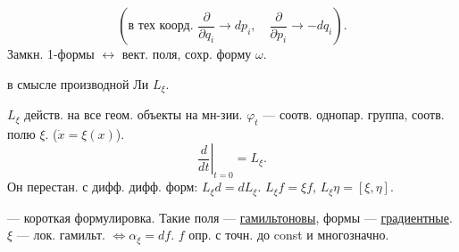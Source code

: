 \begin{equation*}\left(\text{в тех коорд. }\frac{\partial}{\partial q_i}\to dp_i,\quad\frac{\partial}{\partial p_i}\to-dq_i\right).\end{equation*}
Замкн. 1-формы $\leftrightarrow$ вект. поля, сохр. форму $\omega$.
\begin{flushright}в смысле производной Ли $L_\xi$.\end{flushright}
$L_\xi$ действ. на все геом. объекты на мн-зии.
$\varphi_t$ --- соотв. однопар. группа, соотв. полю $\xi$. ($\dot x=\xi(x)$).
\begin{equation*}\left.\frac d{dt}\right|_{t=0}=L_\xi.\end{equation*}
Он перестан. с дифф. дифф. форм: $L_\xi d=dL_\xi$.
$L_\xi f=\xi f$, $L_\xi\eta=[\xi,\eta]$.
\begin{center}\end{center}



--- короткая формулировка.
Такие поля --- \uline{гамильтоновы}, формы --- \uline{градиентные}.
$\xi$ --- лок. гамильт. $\Leftrightarrow\alpha_\xi=df$.
$f$ опр. с точн. до const и многозначно.


